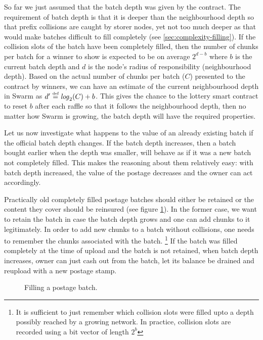 So far we just assumed that the batch depth was given by the contract. The requirement of batch depth is that it is deeper than the neighbourhood depth so that prefix collisions are caught by storer nodes, yet not too much deeper as that would make batches difficult to fill completely (see \ref{sec:complexity-filling}). If the collision slots of the batch have been completely filled, then the number of chunks per batch for a winner to show is expected to be on average $2^{d-b}$ where $b$ is the current batch depth and $d$ is the node's radius of responsibility (neighbourhood depth). Based on the actual number of chunks per batch ($C$) presented to the contract  by winners, we can have an estimate of the current neighbourhood depth in Swarm as $d'\overset{\textrm{\tiny def}}{=}\mathit{log}_2(C)+b$. This gives the chance to the lottery smart contract to reset $b$ after each raffle so that it follows the neighbourhood depth, then no matter how Swarm is growing, the batch depth will have the required properties. 

Let us now investigate what happens to the value of an already existing batch if the official batch depth changes. If the batch depth increases, then a batch bought earlier when the depth was smaller, will behave as if it was a new batch not completely filled. This makes the reasoning about them relatively easy: with batch depth increased, the value of the postage decreases and the owner can act accordingly.

Practically old completely filled postage batches should either be retained or the content they cover should be reinsured (see figure  \ref{fig:filling-a-postage-batch}). In the former case, we want to retain the batch in case the batch depth grows and one can add chunks to it legitimately. In order to add new chunks to a batch without collisions, one needs to remember the chunks associated with the batch.%
%
\footnote{It is sufficient to just remember which collision slots were filled upto a depth possibly reached by a growing network. In practice, collision slots are recorded using a bit vector of length  $2^b$}
%
If the batch was filled completely at the time of upload and the batch is not retained, when batch depth increases, owner can just cash out from the batch, let its balance be drained and reupload with a new postage stamp.



\begin{figure}[htbp]
  \centering
  
  \caption[Filling a postage batch]{Filling a postage batch.}
  \label{fig:filling-a-postage-batch}
\end{figure}


